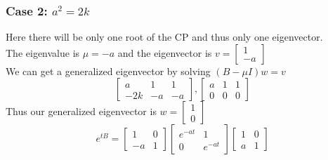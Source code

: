 \documentclass{article}
\begin{document}
\subsubsection*{Case 2: $a^2 = 2k$}
Here there will be only one root of the CP and thus only one eigenvector.\\
The eigenvalue is $\mu = -a$ and the eigenvector is $v = \begin{bmatrix}
    1\\
    -a
\end{bmatrix}$\\
We can get a generalized eigenvector by solving $(B - \mu I)w = v$\\
$$ \begin{bmatrix}
    a & 1 & 1\\
    -2k & -a & -a
\end{bmatrix}, \begin{bmatrix}
    a & 1 & 1\\
    0 & 0 & 0
\end{bmatrix}$$
Thus our generalized eigenvector is $w = \begin{bmatrix}
    1\\
    0
\end{bmatrix}$\\
$$e^{tB} = \begin{bmatrix}
    1 & 0\\
    -a & 1
\end{bmatrix} \begin{bmatrix}
    e^{-at} & 1\\
    0 & e^{-at}
\end{bmatrix} \begin{bmatrix}
    1 & 0\\
    a & 1
\end{bmatrix}$$
\end{document}

